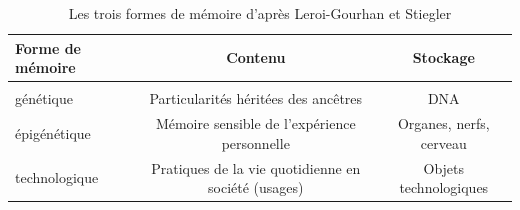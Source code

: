 \begin{table}[ht]
    \begin{tabulary}{\textwidth}{L|C C}
        \centering
        \textbf{Forme de mémoire} &  \textbf{Contenu}  & \textbf{Stockage} \\[3ex]
        \hline \\ [-1.5ex]
        génétique  &  Particularités héritées des ancêtres   &  DNA \\[3ex]
        
        épigénétique   &  Mémoire sensible de l’expérience personnelle   &  Organes, nerfs, cerveau \\[3ex]
        
        technologique  &  Pratiques de la vie quotidienne en société (usages) & Objets technologiques \\[3ex]
    \end{tabulary}
    \caption{Les trois formes de m\'emoire d{\textquoteright}apr\`es Leroi-Gourhan et Stiegler}
\end{table}


